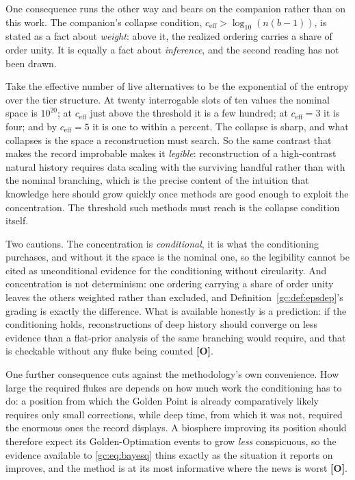 \begin{remark}
\label{gc:rem:legibility}
One consequence runs the other way and bears on the companion rather than
on this work. The companion's collapse condition,
$c_{\mathrm{eff}}>\log_{10}(n(b-1))$, is stated as a fact about
\emph{weight}: above it, the realized ordering carries a share of order
unity. It is equally a fact about \emph{inference}, and the second
reading has not been drawn.

Take the effective number of live alternatives to be the exponential of
the entropy over the tier structure. At twenty interrogable slots of ten
values the nominal space is $10^{20}$; at $c_{\mathrm{eff}}$ just above
the threshold it is a few hundred; at $c_{\mathrm{eff}}=3$ it is four;
and by $c_{\mathrm{eff}}=5$ it is one to within a percent. The collapse
is sharp, and what collapses is the space a reconstruction must search.
So the same contrast that makes the record improbable makes it
\emph{legible}: reconstruction of a high-contrast natural history
requires data scaling with the surviving handful rather than with the
nominal branching, which is the precise content of the intuition that
knowledge here should grow quickly once methods are good enough to
exploit the concentration. The threshold such methods must reach is the
collapse condition itself.

Two cautions. The concentration is \emph{conditional}, it is what the
conditioning purchases, and without it the space is the nominal one, so the legibility cannot be cited as unconditional evidence for the
conditioning without circularity. And concentration is not determinism:
one ordering carrying a share of order unity leaves the others weighted
rather than excluded, and Definition~\ref{gc:def:epsdep}'s grading is exactly the
difference. What is available honestly is a prediction: if the
conditioning holds, reconstructions of deep history should converge on
less evidence than a flat-prior analysis of the same branching would
require, and that is checkable without any fluke being counted
\textbf{[O]}.
\end{remark}

One further consequence cuts against the methodology's own convenience.
How large the required flukes are depends on how much work the
conditioning has to do: a position from which the Golden Point is already comparatively
likely requires only small corrections, while deep time, from which it
was not, required the enormous ones the record displays. A biosphere
improving its position should therefore expect its Golden-Optimation
events to grow \emph{less} conspicuous, so the evidence available to
\eqref{gc:eq:bayesq} thins exactly as the situation it reports on
improves, and the method is at its most informative where the news is
worst \textbf{[O]}.

